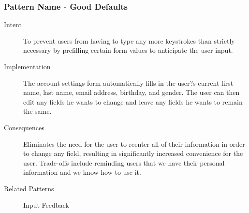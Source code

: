 		\subsubsection{Pattern Name - Good Defaults}
			\begin{description}
				\item[Intent] To prevent users from having to type any more keystrokes than strictly necessary by prefilling certain form values to anticipate the user input.
				\item[Implementation] The account settings form automatically fills in the user?s current first name, last name, email address, birthday, and gender. The user can then edit any fields he wants to change and leave any fields he wants to remain the same.
				\item[Consequences] Eliminates the need for the user to reenter all of their information in order to change any field, resulting in significantly increased convenience for the user. Trade-offs include reminding users that we have their personal information and we know how to use it.
				\item[Related Patterns] Input Feedback
			\end{description}
